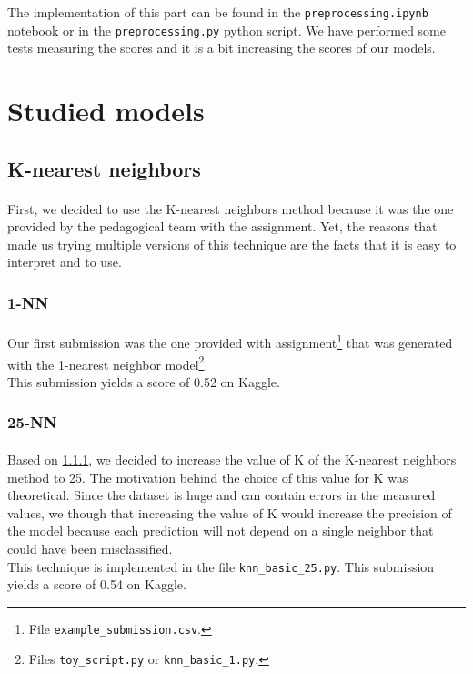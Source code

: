 \documentclass[a4paper, 11pt, oneside]{article}
\begin{document}
The implementation of this part can be found in the \texttt{preprocessing.ipynb} notebook or in the \texttt{preprocessing.py} python script. We have performed some tests measuring the scores and it is a bit increasing the scores of our models.


\section{Studied models}


\subsection{K-nearest neighbors}
\paragraph{}First, we decided to use the K-nearest neighbors method because it was the one provided by the pedagogical team with the assignment. Yet, the reasons that made us trying multiple versions of this technique are the facts that it is easy to interpret and to use.

\subsubsection{1-NN} \label{subsubsec:1NN}
\paragraph{}Our first submission was the one provided with assignment\footnote{File \texttt{example\_submission.csv}.} that was generated with the 1-nearest neighbor model\footnote{Files \texttt{toy\_script.py} or \texttt{knn\_basic\_1.py}.}.\\
This submission yields a score of 0.52 on Kaggle.

\subsubsection{25-NN} \label{subsubsec:25NN}
\paragraph{}Based on \ref{subsubsec:1NN}, we decided to increase the value of K of the K-nearest neighbors method to 25. The motivation behind the choice of this value for K was theoretical. Since the dataset is huge and can contain errors in the measured values, we though that increasing the value of K would increase the precision of the model because each prediction will not depend on a single neighbor that could have been misclassified.\\
This technique is implemented in the file \texttt{knn\_basic\_25.py}. This submission yields a score of 0.54 on Kaggle.
\end{document}
